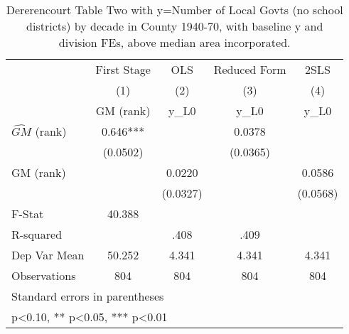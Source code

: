 \begin{table}[htbp]\centering
\def\sym#1{\ifmmode^{#1}\else\(^{#1}\)\fi}
\caption{Dererencourt Table Two with y=Number of Local Govts (no school districts) by decade in County 1940-70, with baseline y and division FEs, above median area incorporated.}
\begin{tabular}{l*{4}{c}}
\toprule
                    & First Stage   &         OLS   &Reduced Form   &        2SLS   \\
                    &\multicolumn{1}{c}{(1)}&\multicolumn{1}{c}{(2)}&\multicolumn{1}{c}{(3)}&\multicolumn{1}{c}{(4)}\\
                    &\multicolumn{1}{c}{GM  (rank)}&\multicolumn{1}{c}{y\_L0}&\multicolumn{1}{c}{y\_L0}&\multicolumn{1}{c}{y\_L0}\\
\midrule
$\hat{GM}$ (rank)   &       0.646***&               &      0.0378   &               \\
                    &    (0.0502)   &               &    (0.0365)   &               \\
\addlinespace
GM  (rank)          &               &      0.0220   &               &      0.0586   \\
                    &               &    (0.0327)   &               &    (0.0568)   \\
\midrule
F-Stat              &      40.388   &               &               &               \\
R-squared           &               &        .408   &        .409   &               \\
Dep Var Mean        &      50.252   &       4.341   &       4.341   &       4.341   \\
Observations        &         804   &         804   &         804   &         804   \\
\bottomrule
\multicolumn{5}{l}{\footnotesize Standard errors in parentheses}\\
\multicolumn{5}{l}{\footnotesize * p<0.10, ** p<0.05, *** p<0.01}\\
\end{tabular}
\end{table}
